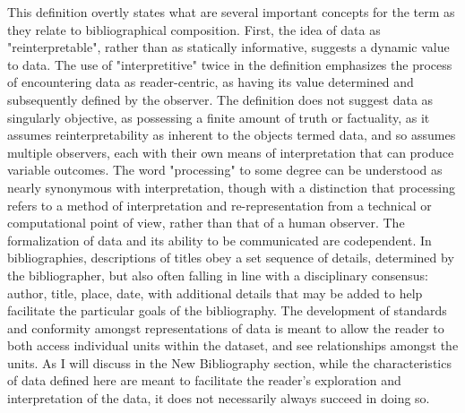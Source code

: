 This definition overtly states what are several important concepts for the term as they relate to bibliographical composition. First, the idea of data as "reinterpretable", rather than as statically informative, suggests a dynamic value to data. The use of "interpretitive" twice in the definition emphasizes the process of encountering data as reader-centric, as having its value determined and subsequently defined by the observer. The definition does not suggest data as  singularly objective, as possessing a finite amount of truth or factuality, as it assumes reinterpretability as inherent to the objects termed data, and so assumes multiple observers, each with their own means of interpretation that can produce variable outcomes. The word "processing" to some degree can be understood as nearly synonymous with interpretation, though with a distinction that processing refers to a method of interpretation and re-representation from a technical or computational point of view, rather than that of a human observer. The formalization of data and its ability to be communicated are codependent. In bibliographies, descriptions of titles obey a set sequence of details, determined by the bibliographer, but also often falling in line with a disciplinary consensus: author, title, place, date, with additional details that may be added to help facilitate the particular goals of the bibliography. The development of standards and conformity amongst representations of data is meant to allow the reader to both access individual units within the dataset, and see relationships amongst the units. As I will discuss in the New Bibliography section, while the characteristics of data defined here are meant to facilitate the reader's exploration and interpretation of the data, it does not necessarily always succeed in doing so.  

